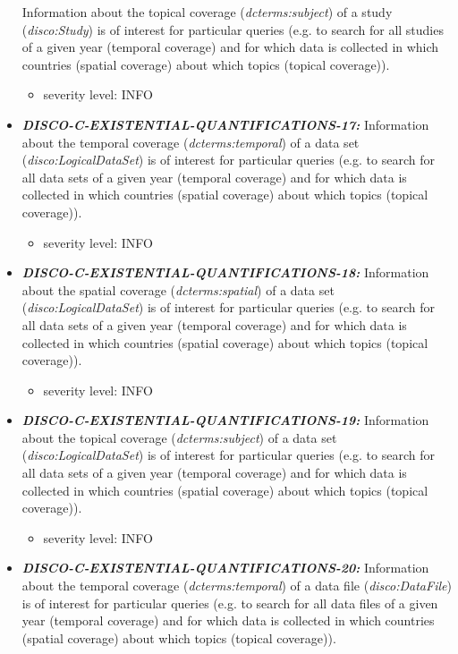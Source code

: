 \documentclass{llncs}
\begin{document}
\begin{itemize}
  Information about the topical coverage (\emph{dcterms:subject}) of a study (\emph{disco:Study}) is of interest for particular queries 
	(e.g. to search for all studies of a given year (temporal coverage) and for which data is collected in which countries (spatial coverage) about which topics (topical coverage)).
	\begin{itemize}
		\item severity level: INFO
	\end{itemize}
	\item \textbf{{\em DISCO-C-EXISTENTIAL-QUANTIFICATIONS-17:}} 
  Information about the temporal coverage (\emph{dcterms:temporal}) of a data set (\emph{disco:LogicalDataSet}) is of interest for particular queries 
	(e.g. to search for all data sets of a given year (temporal coverage) and for which data is collected in which countries (spatial coverage) about which topics (topical coverage)).
	\begin{itemize}
		\item severity level: INFO
	\end{itemize}
	\item \textbf{{\em DISCO-C-EXISTENTIAL-QUANTIFICATIONS-18:}} 
  Information about the spatial coverage (\emph{dcterms:spatial}) of a data set (\emph{disco:LogicalDataSet}) is of interest for particular queries 
	(e.g. to search for all data sets of a given year (temporal coverage) and for which data is collected in which countries (spatial coverage) about which topics (topical coverage)).
	\begin{itemize}
		\item severity level: INFO
	\end{itemize}
	\item \textbf{{\em DISCO-C-EXISTENTIAL-QUANTIFICATIONS-19:}} 
  Information about the topical coverage (\emph{dcterms:subject}) of a data set (\emph{disco:LogicalDataSet}) is of interest for particular queries 
	(e.g. to search for all data sets of a given year (temporal coverage) and for which data is collected in which countries (spatial coverage) about which topics (topical coverage)).
	\begin{itemize}
		\item severity level: INFO
	\end{itemize}
	\item \textbf{{\em DISCO-C-EXISTENTIAL-QUANTIFICATIONS-20:}} 
  Information about the temporal coverage (\emph{dcterms:temporal}) of a data file (\emph{disco:DataFile}) is of interest for particular queries 
	(e.g. to search for all data files of a given year (temporal coverage) and for which data is collected in which countries (spatial coverage) about which topics (topical coverage)).

\end{itemize}
\end{document}
